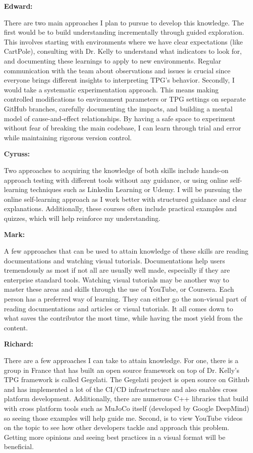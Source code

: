 \documentclass[12pt, titlepage]{article}
\begin{document}
\begin{enumerate}
\textbf{Edward:}

There are two main approaches I plan to pursue to develop this knowledge. The first would be to build understanding incrementally through guided exploration. This involves starting with environments where we have clear expectations (like CartPole), consulting with Dr. Kelly to understand what indicators to look for, and documenting these learnings to apply to new environments. Regular communication with the team about observations and issues is crucial since everyone brings different insights to interpreting TPG's behavior.
Secondly, I would take a systematic experimentation approach. This means making controlled modifications to environment parameters or TPG settings on separate GitHub branches, carefully documenting the impacts, and building a mental model of cause-and-effect relationships. By having a safe space to experiment without fear of breaking the main codebase, I can learn through trial and error while maintaining rigorous version control.


\textbf{Cyruss:}

Two approaches to acquiring the knowledge of both skills include hands-on approach testing with different tools without any guidance, or using online self-learning techniques such as Linkedin Learning or Udemy. I will be pursuing the online self-learning approach as I work better with structured guidance and clear explanations. Additionally, these courses often include practical examples and quizzes, which will help reinforce my understanding.


\textbf{Mark:}

A few approaches that can be used to attain knowledge of these skills are reading documentations and watching visual tutorials. Documentations help users tremendously as most if not all are usually well made, especially if they are enterprise standard tools. Watching visual tutorials may be another way to master these areas and skills through the use of YouTube, or Coursera. Each person has a preferred way of learning. They can either go the non-visual part of reading documentations and articles or visual tutorials. It all comes down to what saves the contributor the most time, while having the most yield from the content.


\textbf{Richard:}

There are a few approaches I can take to attain knowledge. For one, there is a group in France that has built an open source framework on top of Dr. Kelly’s TPG framework is called Gegelati. The Gegelati project is open source on Github and has implemented a lot of the CI/CD infrastructure and also enables cross platform development. Additionally, there are numerous C++ libraries that build with cross platform tools such as MuJoCo itself (developed by Google DeepMind) so seeing those examples will help guide me. Second, is to view YouTube videos on the topic to see how other developers tackle and approach this problem. Getting more opinions and seeing best practices in a visual format will be beneficial. 



\end{enumerate}
\end{document}
